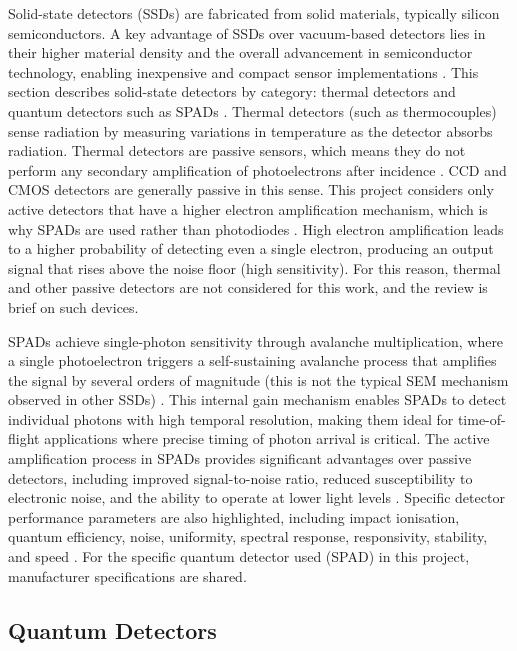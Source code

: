 \documentclass[12pt,a4paper,oneside]{report}
\begin{document}
Solid-state detectors (SSDs) are fabricated from solid materials, typically silicon semiconductors. A key advantage of SSDs over vacuum-based detectors lies in their higher material density and the overall advancement in semiconductor technology, enabling inexpensive and compact sensor implementations \cite{bass2010,kolanoski2020}. This section describes solid-state detectors by category: thermal detectors and quantum detectors such as SPADs \cite{piron2020}. Thermal detectors (such as thermocouples) sense radiation by measuring variations in temperature as the detector absorbs radiation. Thermal detectors are passive sensors, which means they do not perform any secondary amplification of photoelectrons after incidence \cite{bass2010}. CCD and CMOS detectors are generally passive in this sense. This project considers only active detectors that have a higher electron amplification mechanism, which is why SPADs are used rather than photodiodes \cite{piron2020}. High electron amplification leads to a higher probability of detecting even a single electron, producing an output signal that rises above the noise floor (high sensitivity). For this reason, thermal and other passive detectors are not considered for this work, and the review is brief on such devices.

SPADs achieve single-photon sensitivity through avalanche multiplication, where a single photoelectron triggers a self-sustaining avalanche process that amplifies the signal by several orders of magnitude (this is not the typical SEM mechanism observed in other SSDs) \cite{piron2020}. This internal gain mechanism enables SPADs to detect individual photons with high temporal resolution, making them ideal for time-of-flight applications where precise timing of photon arrival is critical. The active amplification process in SPADs provides significant advantages over passive detectors, including improved signal-to-noise ratio, reduced susceptibility to electronic noise, and the ability to operate at lower light levels \cite{piron2020}. Specific detector performance parameters are also highlighted, including impact ionisation, quantum efficiency, noise, uniformity, spectral response, responsivity, stability, and speed \cite{bass2010}. For the specific quantum detector used (SPAD) in this project, manufacturer specifications are shared.

\subsection{Quantum Detectors}
\label{subsec:quantum_detectors}
\end{document}
